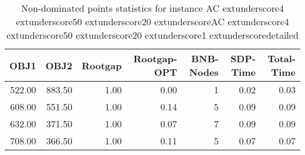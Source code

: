 \begin{table}
\caption{Non-dominated points statistics for instance AC	extunderscore4	extunderscore50	extunderscore20	extunderscoreAC	extunderscore4	extunderscore50	extunderscore20	extunderscore1	extunderscoredetailed}
\label{tab:stats/AC_4_50_20_AC_4_50_20_1_detailed}
\begin{tabular}{rrrrrrr}
\toprule
OBJ1 & OBJ2 & Rootgap & Rootgap-OPT & BNB-Nodes & SDP-Time & Total-Time \\
\midrule
522.00 & 883.50 & 1.00 & 0.00 & 1 & 0.02 & 0.03 \\
608.00 & 551.50 & 1.00 & 0.14 & 5 & 0.09 & 0.09 \\
632.00 & 371.50 & 1.00 & 0.07 & 7 & 0.09 & 0.09 \\
708.00 & 366.50 & 1.00 & 0.11 & 5 & 0.07 & 0.07 \\
\bottomrule
\end{tabular}
\end{table}
